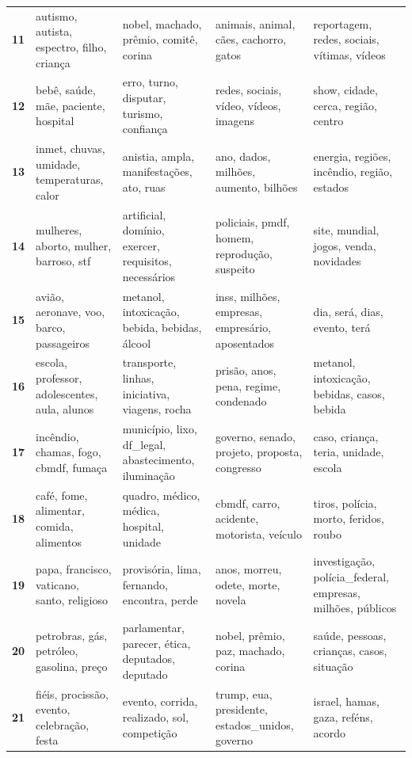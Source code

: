 \begin{xltabular}{\textwidth}{@{}l >{\RaggedRight\arraybackslash}X >{\RaggedRight\arraybackslash}X >{\RaggedRight\arraybackslash}X >{\RaggedRight\arraybackslash}X@{}}
    \textbf{11} & autismo, autista, espectro, filho, criança & nobel, machado, prêmio, comitê, corina & animais, animal, cães, cachorro, gatos & reportagem, redes, sociais, vítimas, vídeos \\
    \textbf{12} & bebê, saúde, mãe, paciente, hospital & erro, turno, disputar, turismo, confiança & redes, sociais, vídeo, vídeos, imagens & show, cidade, cerca, região, centro \\
    \textbf{13} & inmet, chuvas, umidade, temperaturas, calor & anistia, ampla, manifestações, ato, ruas & ano, dados, milhões, aumento, bilhões & energia, regiões, incêndio, região, estados \\
    \textbf{14} & mulheres, aborto, mulher, barroso, stf & artificial, domínio, exercer, requisitos, necessários & policiais, pmdf, homem, reprodução, suspeito & site, mundial, jogos, venda, novidades \\
    \textbf{15} & avião, aeronave, voo, barco, passageiros & metanol, intoxicação, bebida, bebidas, álcool & inss, milhões, empresas, empresário, aposentados & dia, será, dias, evento, terá \\
    \textbf{16} & escola, professor, adolescentes, aula, alunos & transporte, linhas, iniciativa, viagens, rocha & prisão, anos, pena, regime, condenado & metanol, intoxicação, bebidas, casos, bebida \\
    \textbf{17} & incêndio, chamas, fogo, cbmdf, fumaça & município, lixo, df\_legal, abastecimento, iluminação & governo, senado, projeto, proposta, congresso & caso, criança, teria, unidade, escola \\
    \textbf{18} & café, fome, alimentar, comida, alimentos & quadro, médico, médica, hospital, unidade & cbmdf, carro, acidente, motorista, veículo & tiros, polícia, morto, feridos, roubo \\
    \textbf{19} & papa, francisco, vaticano, santo, religioso & provisória, lima, fernando, encontra, perde & anos, morreu, odete, morte, novela & investigação, polícia\_federal, empresas, milhões, públicos \\
    \textbf{20} & petrobras, gás, petróleo, gasolina, preço & parlamentar, parecer, ética, deputados, deputado & nobel, prêmio, paz, machado, corina & saúde, pessoas, crianças, casos, situação \\
    \textbf{21} & fiéis, procissão, evento, celebração, festa & evento, corrida, realizado, sol, competição & trump, eua, presidente, estados\_unidos, governo & israel, hamas, gaza, reféns, acordo \\

\end{xltabular}
